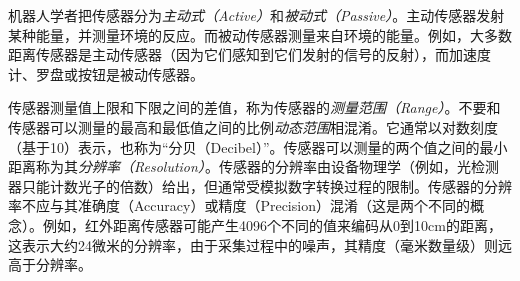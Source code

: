 
机器人学者把传感器分为\emph{主动式（Active）}和\emph{被动式（Passive）}。主动传感器发射某种能量，并测量环境的反应。而被动传感器测量来自环境的能量。例如，大多数距离传感器是主动传感器（因为它们感知到它们发射的信号的反射），而加速度计、罗盘或按钮是被动传感器。


传感器测量值上限和下限之间的差值，称为传感器的\emph{测量范围（Range）}。不要和传感器可以测量的最高和最低值之间的比例\emph{动态范围}相混淆。它通常以对数刻度（基于10）表示，也称为“分贝（Decibel）”。传感器可以测量的两个值之间的最小距离称为其\emph{分辨率（Resolution）}。传感器的分辨率由设备物理学（例如，光检测器只能计数光子的倍数）给出，但通常受模拟数字转换过程的限制。传感器的分辨率不应与其准确度（Accuracy）或精度（Precision）混淆（这是两个不同的概念）。例如，红外距离传感器可能产生4096个不同的值来编码从0到10cm的距离，这表示大约24微米的分辨率，由于采集过程中的噪声，其精度（毫米数量级）则远高于分辨率。


